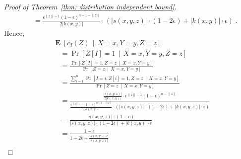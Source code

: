 \documentclass[11pt]{article}
\newcommand{\norm}[1]{\left\| #1 \right\|}
\DeclareMathOperator{\Exp}{\mathbf{E}}
\begin{document}
\begin{proof}[Proof of Theorem~\ref{thm: distribution independent bound}]
\begin{align*}
& \quad = \frac{\epsilon^{\norm{z} - 1} (1 - \epsilon)^{n - 1 - \norm{z}}}{2|k(x,y)|} \cdot \left( |s(x,y,z)| \cdot (1 - 2\epsilon) + |k(x,y)| \cdot \epsilon \right) \; .
\end{align*}
Hence,
\begin{align*}
& \Exp\left[ c_I(Z) \, \middle| \, X = x, Y = y, Z = z \right] \\
& \quad = \Pr \left[ Z[I] = 1 \, \middle| \, X = x, Y = y, Z = z \right] \\
& \quad = \frac{\displaystyle \Pr \left[ Z[I] = 1, Z = z \, \middle| \, X = x, Y = y \right]}{\displaystyle \Pr \left[ Z = z \, \middle| \, X = x, Y = y \right]} \\
& \quad = \frac{\displaystyle \sum_{i=1}^n \Pr \left[ I = i, Z[i] = 1, Z = z \, \middle| \, X = x, Y = y \right]}{\displaystyle \Pr \left[ Z = z \, \middle| \, X = x, Y = y \right]} \\
& \quad = \frac{\displaystyle \frac{|s(x,y,z)|}{2|k(x,y)|} \cdot \epsilon^{\norm{z} - 1} (1 - \epsilon)^{n - \norm{z}}}{\displaystyle \frac{\epsilon^{\norm{z} - 1} (1 - \epsilon)^{n - 1 - \norm{z}}}{2|k(x,y)|} \cdot \left( |s(x,y,z)| \cdot (1 - 2\epsilon) + |k(x,y,z)| \cdot \epsilon \right)} \\
& \quad = \frac{\displaystyle |s(x,y,z)| \cdot (1 - \epsilon)}{\displaystyle |s(x,y,z)| \cdot (1 - 2\epsilon) + |k(x,y)| \cdot \epsilon } \\
& \quad = \frac{\displaystyle 1 - \epsilon}{\displaystyle 1 - 2\epsilon + \frac{|k(x,y)| \cdot \epsilon}{|s(x,y,z)|}} \\
\end{align*}


\end{proof}
\end{document}
